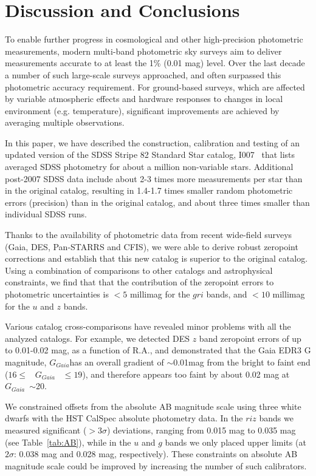 \documentclass[fleqn,usenatbib]{mnras}
\newcommand{\pO}{\hbox{I007}}
\newcommand{\GG}{\hbox{$G_{Gaia}$}}
\begin{document}
\section{Discussion and Conclusions} \label{sec:disc}

To enable further progress in cosmological and other high-precision photometric measurements, 
modern multi-band photometric sky surveys aim to deliver measurements accurate to at least the 1\% 
(0.01 mag) level. Over the last decade a number of such large-scale surveys approached, and
often surpassed this photometric accuracy requirement. For ground-based surveys, which are 
affected by variable atmospheric effects and hardware responses to changes in local environment
(e.g. temperature), significant improvements are achieved by averaging multiple observations. 

In this paper, we have described the construction, calibration and testing of an updated version of the
SDSS Stripe 82 Standard Star catalog, \pO\  \citep{Ivez07} that lists averaged SDSS photometry for about
a million non-variable stars. Additional post-2007 SDSS data include about 
2-3 times more measurements per star than in the original catalog, resulting in 1.4-1.7 times smaller 
random photometric errors (precision) than in the original catalog, and about three times smaller than individual SDSS runs.

Thanks to the availability of photometric data from recent wide-field surveys (Gaia, DES, Pan-STARRS
and CFIS), we were able to derive robust zeropoint corrections and establish that this new catalog
is superior to the original catalog. Using a combination of comparisons to other catalogs and 
astrophysical constraints, we find that that the contribution of the zeropoint errors to photometric
uncertainties is $<5$ millimag for the $gri$ bands, and $<10$ millimag for the $u$ and $z$ bands. 

Various catalog cross-comparisons have revealed minor problems with all the analyzed catalogs.
For example, we detected DES $z$ band zeropoint errors of up to 0.01-0.02 mag, as a function 
of R.A., and demonstrated that the Gaia EDR3 G magnitude, \GG has an overall gradient of $\sim$0.01mag from the bright to faint end ($ 16 \leq$ ~\GG~ $\leq 19$), and therefore appears too faint by about 0.02 mag at \GG~$\sim$20.
 
We constrained offsets from the absolute AB magnitude scale using three white dwarfs with the 
HST CalSpec absolute photometry data. In the $riz$ bands we measured significant ($>3\sigma$) 
deviations, ranging from 0.015 mag to 0.035 mag (see Table~\ref{tab:AB}), while in the $u$ and $g$ 
bands we only placed upper limits (at $2\sigma$: 0.038 mag and 0.028 mag, respectively). These
constraints on absolute AB magnitude scale could be improved by increasing the number of such 
calibrators.
\end{document}
